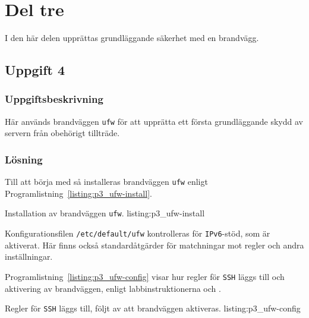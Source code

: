 %
%
%


\section{Del tre}
I den här delen upprättas grundläggande säkerhet med en brandvägg.


\subsection{Uppgift 4}
\subsubsection{Uppgiftsbeskrivning}
Här används brandväggen \texttt{ufw} för att upprätta ett första grundläggande
skydd av servern från obehörigt tillträde.

\subsubsection{Lösning}
Till att börja med så installeras brandväggen \texttt{ufw} enligt 
Programlistning~\ref{listing:p3_ufw-install}.

            {Installation av brandväggen \texttt{ufw}.}
            {listing:p3_ufw-install}

Konfigurationsfilen \texttt{/etc/default/ufw} kontrolleras för
\texttt{IPv6}-stöd, som är aktiverat. Här finns också standardåtgärder för
matchningar mot regler och andra inställningar.

Programlistning~\ref{listing:p3_ufw-config} visar hur regler för \texttt{SSH}
läggs till och aktivering av brandväggen, enligt
labbinstruktionerna\cite{dvg001:instruktionerLab5} och \cite{ubuntu:ufw}.

            {Regler för \texttt{SSH} läggs till, följt av att brandväggen
             aktiveras.}
            {listing:p3_ufw-config}

